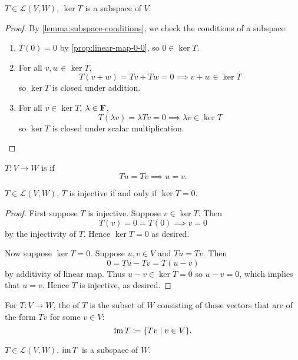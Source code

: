 \begin{proposition}
$T\in\mathcal{L}(V,W)$, $\ker T$ is a subspace of $V$.
\end{proposition}

\begin{proof}
By \cref{lemma:subspace-conditions}, we check the conditions of a subspace:
\begin{enumerate}[label=(\roman*)]
\item $T(0)=0$ by \cref{prop:linear-map-0-0}, so $0\in\ker T$.
\item For all $v,w\in\ker T$, 
\[T(v+w)=Tv+Tw=0\implies v+w\in\ker T\]
so $\ker T$ is closed under addition.
\item For all $v\in\ker T$, $\lambda\in\mathbf F$,
\[T(\lambda v)=\lambda Tv=0\implies\lambda v\in\ker T\]
so $\ker T$ is closed under scalar multiplication.
\end{enumerate}
\end{proof}

\begin{definition}[Injectivity]
$T:V\to W$ is  if
\[Tu=Tv\implies u=v.\]
\end{definition}

\begin{proposition}
$T\in\mathcal{L}(V,W)$, $T$ is injective if and only if $\ker T=0$.
\end{proposition}

\begin{proof}
First suppose $T$ is injective. Suppose $v\in\ker T$. Then
\[T(v)=0=T(0)\implies v=0\]
by the injectivity of $T$. Hence $\ker T=0$ as desired.

Now suppose $\ker T=0$. Suppose $u,v\in V$ and $Tu=Tv$. Then
\[0=Tu-Tv=T(u-v)\]
by additivity of linear map. Thus $u-v\in\ker T=0$ so $u-v=0$, which implies that $u=v$. Hence $T$ is injective, as desired.
\end{proof}

\begin{definition}[Image]
For $T:V\to W$, the  of $T$ is the subset of $W$ consisting of those vectors that are of the form $Tv$ for some $v\in V$:
\[\operatorname{im} T\coloneqq\{Tv\mid v\in V\}.\]
\end{definition}

\begin{proposition}
$T\in\mathcal{L}(V,W)$, $\operatorname{im} T$ is a subspace of $W$.
\end{proposition}

